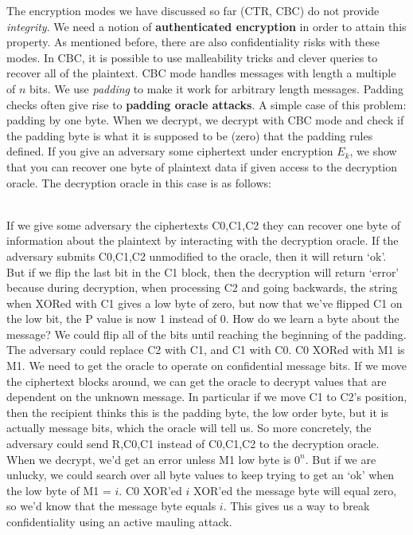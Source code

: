 The encryption modes we have discussed so far (CTR, CBC) do not provide \emph{integrity}. We need a notion of \textbf{authenticated encryption} in order to attain this property. 
As mentioned before, there are also confidentiality risks with these modes. In CBC, it is possible to use malleability tricks and clever queries to recover all of the plaintext. 
CBC mode handles messages with length a multiple of $n$ bits. We use \emph{padding} to make it work for arbitrary length messages. Padding checks often give rise to {\bf padding oracle attacks}.
A simple case of this problem: padding by one byte. When we decrypt, we decrypt with CBC mode and check if the padding byte is what it is supposed to be (zero) that the padding rules defined. If you give an adversary some ciphertext under encryption $E_k$, we show that you can recover one byte of plaintext data if given access to the decryption oracle. 
The decryption oracle in this case is as follows:

\vspace{0.2cm}\\

If we give some adversary the ciphertexts C0,C1,C2 they can recover one byte of information about the plaintext by interacting with the decryption oracle. If the adversary submits C0,C1,C2 unmodified to the oracle, then it will return `ok'. But if we flip the last bit in the C1 block, then the decryption will return `error' because during decryption, when processing C2 and going backwards, the string when XORed with C1 gives a low byte of zero, but now that we've flipped C1 on the low bit, the P value is now 1 instead of 0. How do we learn a byte about the message? We could flip all of the bits until reaching the beginning of the padding.
The adversary could replace C2 with C1, and C1 with C0. C0 XORed with M1 is M1. 
%
We need to get the oracle to operate on confidential message bits. If we move the ciphertext blocks around, we can get the oracle to decrypt values that are dependent on the unknown message. In particular if we move C1 to C2's position, then the recipient thinks this is the padding byte, the low order byte, but it is actually message bits, which the oracle will tell us.
So more concretely, the adversary could send R,C0,C1 instead of C0,C1,C2 to the decryption oracle. When we decrypt, we'd get an error unless M1 low byte is $0^n$. But if we are unlucky, we could search over all byte values to keep trying to get an `ok' when the low byte of M1 = $i$. C0 XOR'ed $i$ XOR'ed the message byte will equal zero, so we'd know that the message byte equals $i$. This gives us a way to break confidentiality using an active mauling attack. 

